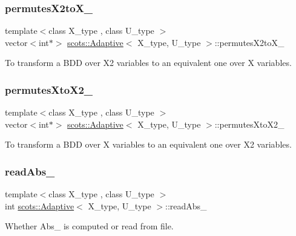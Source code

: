 \subsubsection{\texorpdfstring{permutes\+X2to\+X\+\_\+}{permutesX2toX\_}}
{\footnotesize\ttfamily template$<$class X\+\_\+type , class U\+\_\+type $>$ \\
vector$<$int$\ast$$>$ \hyperlink{classscots_1_1Adaptive}{scots\+::\+Adaptive}$<$ X\+\_\+type, U\+\_\+type $>$\+::permutes\+X2to\+X\+\_\+}

To transform a B\+DD over X2 variables to an equivalent one over X variables. \mbox{\label{classscots_1_1Adaptive_ae954d4d3177bdc4093530e254ace2b34}} 
\subsubsection{\texorpdfstring{permutes\+Xto\+X2\+\_\+}{permutesXtoX2\_}}
{\footnotesize\ttfamily template$<$class X\+\_\+type , class U\+\_\+type $>$ \\
vector$<$int$\ast$$>$ \hyperlink{classscots_1_1Adaptive}{scots\+::\+Adaptive}$<$ X\+\_\+type, U\+\_\+type $>$\+::permutes\+Xto\+X2\+\_\+}

To transform a B\+DD over X variables to an equivalent one over X2 variables. \mbox{\label{classscots_1_1Adaptive_a8c2a7e89feeb75f0b51fdf9c8d1359e7}} 
\subsubsection{\texorpdfstring{read\+Abs\+\_\+}{readAbs\_}}
{\footnotesize\ttfamily template$<$class X\+\_\+type , class U\+\_\+type $>$ \\
int \hyperlink{classscots_1_1Adaptive}{scots\+::\+Adaptive}$<$ X\+\_\+type, U\+\_\+type $>$\+::read\+Abs\+\_\+}

Whether Abs\+\_\+ is computed or read from file. \mbox{\label{classscots_1_1Adaptive_a95926f102459b6ec3525040c791ff359}} 
